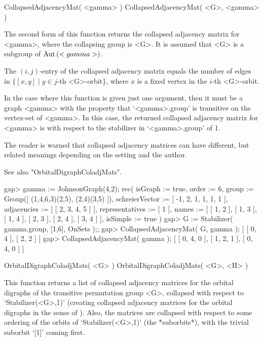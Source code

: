 
\>CollapsedAdjacencyMat( <gamma> )
\>CollapsedAdjacencyMat( <G>, <gamma> )

The second form of this function returns  the  collapsed adjacency
matrix for <gamma>, where the  collapsing group  is <G>.  It is
assumed that <G> is a subgroup of ${\rm Aut}\,(<gamma>)$.

The $(i,j)$-entry of the collapsed adjacency matrix  equals the number of
edges in   $\{ [x,y]\mid  y \in j$-th <G>-orbit$\}$, where  $x$ is  a fixed
vertex in the $i$-th <G>-orbit.

In the case where this function is given just one argument, then it must
be a graph <gamma> with the property that `<gamma>.group' is transitive on
the vertex-set of <gamma>.  In this case, the returned collapsed adjacency
matrix for <gamma> is with respect to the stabilizer in `<gamma>.group'
of 1.

The reader is warned that collapsed adjacency matrices can have different,
but related meanings depending on the setting and the author.

See also "OrbitalDigraphColadjMats".

\beginexample
gap> gamma := JohnsonGraph(4,2);
rec( isGraph := true, order := 6,
  group := Group([ (1,4,6,3)(2,5), (2,4)(3,5) ]),
  schreierVector := [ -1, 2, 1, 1, 1, 1 ], adjacencies := [ [ 2, 3, 4, 5 ] ],
  representatives := [ 1 ],
  names := [ [ 1, 2 ], [ 1, 3 ], [ 1, 4 ], [ 2, 3 ], [ 2, 4 ], [ 3, 4 ] ],
  isSimple := true )
gap> G := Stabilizer( gamma.group, [1,6], OnSets );;
gap> CollapsedAdjacencyMat( G, gamma );
[ [ 0, 4 ], [ 2, 2 ] ]
gap> CollapsedAdjacencyMat( gamma );
[ [ 0, 4, 0 ], [ 1, 2, 1 ], [ 0, 4, 0 ] ]
\endexample


\>OrbitalDigraphColadjMats( <G> )
\>OrbitalDigraphColadjMats( <G>, <H> )

This function returns a list of collapsed adjacency matrices for the
orbital digraphs of the transitive permutation group <G>, collapsed
with respect to `Stabilizer(<G>,1)' (creating collapsed adjacency
matrices for the orbital digraphs in the sense of \cite{PS97}). Also,
the matrices are collapsed with respect to some ordering of the
orbits of `Stabilizer(<G>,1)' (the *suborbits*), with the trivial 
suborbit `[1]' coming first.

